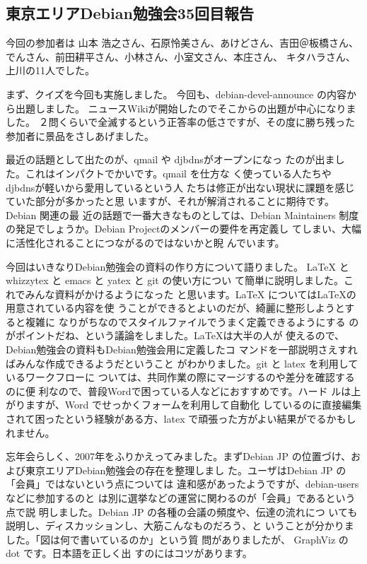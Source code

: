 \documentclass[mingoth,a4paper]{jsarticle}
\begin{document}
\subsection{東京エリアDebian勉強会35回目報告}


今回の参加者は
山本 浩之さん、石原怜美さん、あけどさん、吉田＠板橋さん、でんさん、前田耕平さん、小林さん、小室文さん、本庄さん、
キタハラさん、
上川の11人でした。

まず、クイズを今回も実施しました。
今回も、debian-devel-announce の内容から出題しました。
ニュースWikiが開始したのでそこからの出題が中心になりました。
２問くらいで全滅するという正答率の低さですが、その度に勝ち残った参加者に景品をさしあげました。


最近の話題として出たのが、qmail や djbdnsがオープンになっ
たのが出ました。これはインパクトでかいです。qmail を仕方な
く使っている人たちや djbdnsが軽いから愛用しているという人
たちは修正が出ない現状に課題を感じていた部分が多かったと思
いますが、それが解消されることに期待です。Debian 関連の最
近の話題で一番大きなものとしては、Debian Maintainers 制度
の発足でしょうか。Debian Projectのメンバーの要件を再定義し
てしまい、大幅に活性化されることにつながるのではないかと睨
んでいます。


今回はいきなりDebian勉強会の資料の作り方について語りました。
LaTeX と whizzytex と emacs と yatex と git の使い方につい
て簡単に説明しました。これでみんな資料がかけるようになった
と思います。LaTeX についてはLaTeXの用意されている内容を使
うことができるとよいのだが、綺麗に整形しようとすると複雑に
なりがちなのでスタイルファイルでうまく定義できるようにする
のがポイントだね、という議論をしました。LaTeXは大半の人が
使えるので、Debian勉強会の資料もDebian勉強会用に定義したコ
マンドを一部説明さえすればみんな作成できるようだということ
がわかりました。git と latex を利用しているワークフローに
ついては、共同作業の際にマージするのや差分を確認するのに便
利なので、普段Wordで困っている人などにおすすめです。ハード
ルは上がりますが、Word でせっかくフォームを利用して自動化
しているのに直接編集されて困ったという経験がある方、latex 
で頑張った方がよい結果がでるかもしれません。


忘年会らしく、2007年をふりかえってみました。まずDebian JP
の位置づけ、および東京エリアDebian勉強会の存在を整理しまし
た。ユーザはDebian JP の「会員」ではないという点については
違和感があったようですが、debian-users などに参加するのと
は別に選挙などの運営に関わるのが「会員」であるという点で説
明しました。Debian JP の各種の会議の頻度や、伝達の流れにつ
いても説明し、ディスカッションし、大筋こんなものだろう、と
いうことが分かりました。「図は何で書いているのか」という質
問がありましたが、 GraphViz の dot です。日本語を正しく出
すのにはコツがあります。
\end{document}
